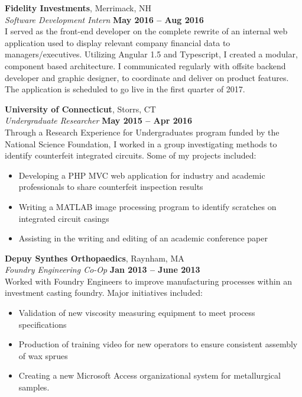 \documentclass[margin,line]{resume}
\begin{document}
\begin{resume}
    \textbf{Fidelity Investments}, Merrimack, NH \vspace{2mm}\\\vspace{1mm}%
    \textsl{Software Development Intern} \hfill \textbf{May 2016 -- Aug 2016}\\
   I served as the front-end developer on the complete rewrite of an internal web application used to display relevant company financial data to managers/executives. Utilizing Angular 1.5 and Typescript, I created a modular, component based architecture. I communicated regularly with offsite backend developer and graphic designer, to coordinate and deliver on product features. The application is scheduled to go live in the first quarter of 2017. 

    \textbf{University of Connecticut}, Storrs, CT \vspace{2mm}\\\vspace{1mm}%
    \textsl{Undergraduate Researcher} \hfill \textbf{May 2015 -- Apr 2016}\\
    Through a Research Experience for Undergraduates program funded by the National Science Foundation, I worked in a group investigating methods to identify counterfeit integrated circuits. Some of my projects included:
    \begin{itemize}
     \item Developing a PHP MVC web application for industry and academic professionals to share counterfeit inspection results
     \item Writing a MATLAB image processing program  to identify scratches on integrated circuit casings
     \item Assisting in the writing and editing of an academic conference paper
    \end{itemize}
    
    \textbf{Depuy Synthes Orthopaedics}, Raynham, MA \vspace{2mm}\\\vspace{1mm}%
    \textsl{Foundry Engineering Co-Op} \hfill \textbf{Jan 2013 -- June 2013}\\
    Worked with Foundry Engineers to improve manufacturing processes within an investment casting foundry. Major initiatives included:
    \begin{itemize}
        \item  Validation of new viscosity measuring equipment to meet process specifications
        \item Production of training video for new operators to ensure consistent assembly of wax sprues
        \item Creating a new Microsoft Access organizational system for metallurgical samples.
    \end{itemize}



\end{resume}
\end{document}
